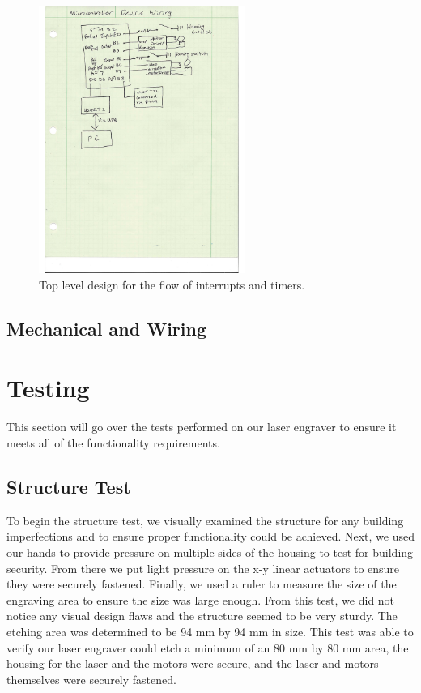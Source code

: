 \documentclass[11pt]{LaTeX-Classes/math-hw}
\begin{document}
\begin{figure}[H]
	   \begin{center}
	     \includegraphics[width=0.6\textwidth]{mcwiringdiagram}
	     \caption{Top level design for the flow of interrupts and timers.}
	     \label{fig:mcwiringdiagram}
	   \end{center}
	 \end{figure}

\subsection{Mechanical and Wiring}

\section{Testing}
This section will go over the tests performed on our laser engraver to ensure it meets all of the functionality requirements. 

\subsection{Structure Test}
To begin the structure test, we visually examined the structure for any building imperfections and to ensure proper functionality could be achieved. Next, we used our hands to provide pressure on multiple sides of the housing to test for building security. From there we put light pressure on the x-y linear actuators to ensure they were securely fastened. Finally, we used a ruler to measure the size of the engraving area to ensure the size was large enough. From this test, we did not notice any visual design flaws and the structure seemed to be very sturdy. The etching area was determined to be 94 mm by 94 mm in size. This test was able to verify our laser engraver could etch a minimum of an 80 mm by 80 mm area, the housing for the laser and the motors were secure, and the laser and motors themselves were securely fastened.
\end{document}
